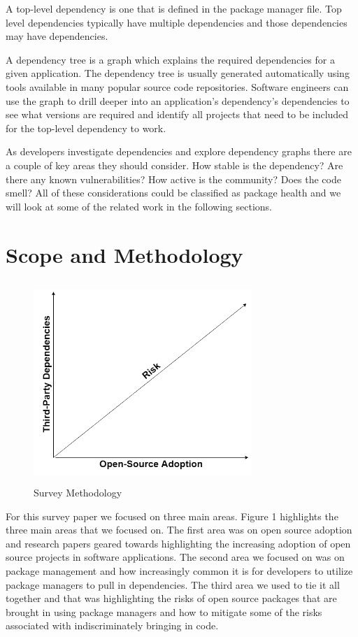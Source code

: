 \documentclass[journal]{IEEEtran}
\begin{document}
A top-level dependency is one that is defined in the package manager file. Top level dependencies typically have multiple dependencies and those dependencies may have dependencies.  

A dependency tree is a graph which explains the required dependencies for a given application. The dependency tree is usually generated automatically using tools available in many popular source code repositories. Software engineers can use the graph to drill deeper into an application’s dependency’s dependencies to see what versions are required and identify all projects that need to be included for the top-level dependency to work. 

As developers investigate dependencies and explore dependency graphs there are a couple of key areas they should consider. How stable is the dependency? Are there any known vulnerabilities? How active is the community? Does the code smell? All of these considerations could be classified as package health and we will look at some of the related work in the following sections. 


\section{Scope and Methodology}

\begin{figure}
\centering
\includegraphics[width=3.25in,height=3in,clip,keepaspectratio]{images/method.png}
\caption{Survey Methodology}
\end{figure}

For this survey paper we focused on three main areas. Figure 1 highlights the three main areas that we focused on. The first area was on open source adoption and research papers geared towards highlighting the increasing adoption of open source projects in software applications. The second area we focused on was on package management and how increasingly common it is for developers to utilize package managers to pull in dependencies. The third area we used to tie it all together and that was highlighting the risks of open source packages that are brought in using package managers and how to mitigate some of the risks associated with indiscriminately bringing in code. 
\end{document}
